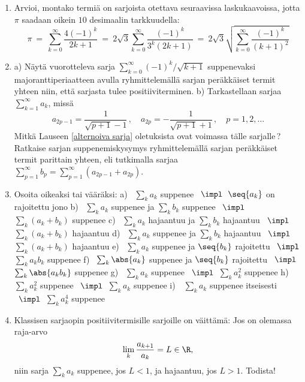 \begin{enumerate}
\item
Arvioi, montako termiä on sarjoista otettava seuraavissa laskukaavoissa, jotta $\pi$
saadaan oikein $10$ desimaalin tarkkuudella:
\[
\pi\ =\ \sum_{k=0}^\infty \frac{4(-1)^k}{2k+1}\ 
     =\ 2\sqrt{3}\sum_{k=0}^\infty \frac{(-1)^k}{3^k(2k+1)}\
     =\ 2\sqrt{3}\sqrt{\sum_{k=0}^\infty \frac{(-1)^k}{(k+1)^2}}
\]

\item
a) Näytä vuorotteleva sarja $\sum_{k=0}^\infty (-1)^k/\sqrt{k+1}$ suppenevaksi
majoranttiperiaatteen avulla ryhmittelemällä sarjan peräkkäiset termit yhteen niin, että
sarjasta tulee positiiviterminen. \vspace{1mm}\newline
b) Tarkastellaan sarjaa $\sum_{k=1}^\infty a_k$, missä
\[
a_{2p-1}=\frac{1}{\sqrt{p+1}-1}\,, \quad a_{2p}=-\frac{1}{\sqrt{p+1}+1}\,, \quad p=1,2,\ldots
\]
Mitkä Lauseen \ref{alternoiva sarja} oletuksista ovat voimassa tälle sarjalle\,? Ratkaise
sarjan suppenemiskysymys  ryhmittelemällä sarjan peräkkäiset termit parittain yhteen, eli
tutkimalla sarjaa $\sum_{p=1}^\infty b_p = \sum_{p=1}^\infty (a_{2p-1}+a_{2p})$.

\item
Osoita oikeaksi tai vääräksi: \newline
a) \ $\sum_k a_k$ suppenee $\,\ \impl\,$ $\seq{a_k}$ on rajoitettu jono \newline
b) \ $\sum_k a_k$ suppenee ja $\sum_k b_k$ suppenee $\ \,\impl\,$ $\sum_k(a_k+b_k)$ 
     suppenee \newline
c) \ $\sum_k a_k$ hajaantuu ja $\sum_k b_k$ hajaantuu $\,\ \impl\,$ $\sum_k(a_k+b_k)$ 
     hajaantuu \newline
d) \ $\sum_k a_k$ suppenee ja $\sum_k b_k$ hajaantuu $\,\ \impl\,$ $\sum_k(a_k+b_k)$ 
     hajaantuu \newline
e) \ $\sum_k a_k$ suppenee ja $\seq{b_k}$ rajoitettu $\,\ \impl\,$ $\sum_k a_k b_k$
     suppenee \newline
f) \ $\sum_k \abs{a_k}$ suppenee ja $\seq{b_k}$ rajoitettu $\,\ \impl\,$
     $\sum_k \abs{a_k b_k}$ suppenee \newline
g) \ $\sum_k a_k$ suppenee $\,\ \impl\,$ $\sum_k a_k^2$ suppenee \newline
h) \ $\sum_k a_k^2$ suppenee $\,\ \impl\,$ $\sum_k a_k$ suppenee \newline
i) \ $\,\sum_k a_k$ suppenee itseisesti $\,\ \impl\,$ $\sum_k a_k^4$ suppenee

\item \index{suhdetesti (sarjaopin)}
Klassisen sarjaopin  positiivitermisille sarjoille on väittämä: Jos on 
olemassa raja-arvo
\[
\lim_k \frac{a_{k+1}}{a_k} = L\in\R,
\]
niin sarja $\sum_k a_k$ suppenee, jos $L<1$, ja hajaantuu, jos $L>1$. Todista!


\end{enumerate}
